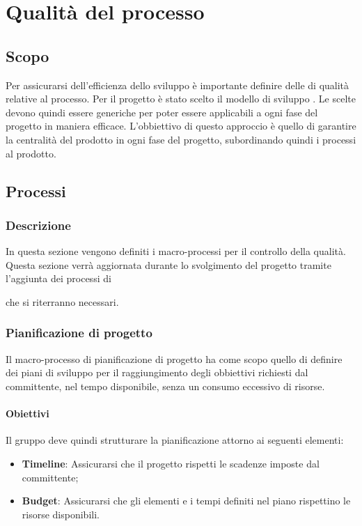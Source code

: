 \section{Qualità del processo}

\subsection{Scopo}
Per assicurarsi dell'efficienza dello sviluppo è importante definire delle  di qualità relative al processo.
Per il progetto è stato scelto il modello di sviluppo .
Le  scelte devono quindi essere generiche per poter essere applicabili a ogni fase del progetto in maniera efficace.
L'obbiettivo di questo approccio è quello di garantire la centralità del prodotto in ogni fase del progetto, subordinando quindi i processi al prodotto.

\subsection{Processi}
\subsubsection{Descrizione}
In questa sezione vengono definiti i macro-processi per il controllo della qualità.
Questa sezione verrà aggiornata durante lo svolgimento del progetto tramite l'aggiunta dei processi di  che si riterranno necessari.

\subsubsection{Pianificazione di progetto}
Il macro-processo di pianificazione di progetto ha come scopo quello di definire dei piani di sviluppo per il raggiungimento degli obbiettivi richiesti dal committente, nel tempo disponibile, senza un consumo eccessivo di risorse.

\paragraph{Obiettivi}
Il gruppo \gruppo{} deve quindi strutturare la pianificazione attorno ai seguenti elementi:
\begin{itemize}
\item \textbf{Timeline}: Assicurarsi che il progetto rispetti le scadenze imposte dal committente;
\item \textbf{Budget}: Assicurarsi che gli elementi e i tempi definiti nel piano rispettino le risorse disponibili.
\end{itemize}

